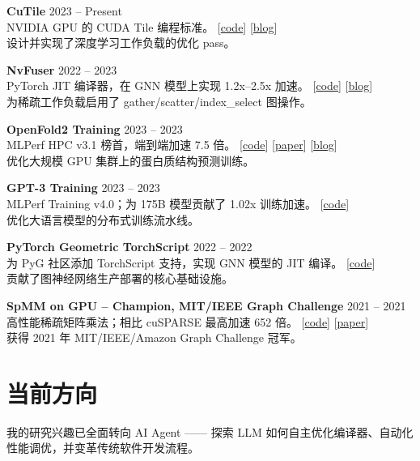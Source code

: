 \documentclass[11pt,a4paper]{article}
\newcommand{\projectentry}[5]{%
    \noindent\textbf{#1} \hfill #2 \\[2pt]
    #4 \hfill {\small #3} \\[1pt]
    #5\par\vspace{8pt}%
}
\begin{document}
\projectentry{CuTile}{2023 -- Present}{[\href{https://github.com/NVIDIA/cutile-python}{code}] [\href{https://developer.nvidia.com/blog/tag/cutile/}{blog}]}
{NVIDIA GPU 的 CUDA Tile 编程标准。}
{设计并实现了深度学习工作负载的优化 pass。}

\projectentry{NvFuser}{2022 -- 2023}{[\href{https://github.com/csarofeen/pytorch/commits/devel/?author=ftxj}{code}] [\href{https://pytorch.org/blog/introducing-nvfuser-a-deep-learning-compiler-for-pytorch/}{blog}]}
{PyTorch JIT 编译器，在 GNN 模型上实现 1.2x--2.5x 加速。}
{为稀疏工作负载启用了 gather/scatter/index\_select 图操作。}

\projectentry{OpenFold2 Training}{2023 -- 2023}{[\href{https://github.com/mlcommons/hpc_results_v3.0/tree/main/NVIDIA/benchmarks/openfold}{code}] [\href{https://arxiv.org/abs/2404.11068}{paper}] [\href{https://developer.nvidia.com/blog/optimizing-openfold-training-for-drug-discovery/}{blog}]}
{MLPerf HPC v3.1 榜首，端到端加速 7.5 倍。}
{优化大规模 GPU 集群上的蛋白质结构预测训练。}

\projectentry{GPT-3 Training}{2023 -- 2023}{[\href{https://github.com/NVIDIA/Megatron-LM}{code}]}
{MLPerf Training v4.0；为 175B 模型贡献了 1.02x 训练加速。}
{优化大语言模型的分布式训练流水线。}

\projectentry{PyTorch Geometric TorchScript}{2022 -- 2022}{[\href{https://github.com/pyg-team/pytorch_geometric/commits/master/?author=ftxj}{code}]}
{为 PyG 社区添加 TorchScript 支持，实现 GNN 模型的 JIT 编译。}
{贡献了图神经网络生产部署的核心基础设施。}

\projectentry{SpMM on GPU -- Champion, MIT/IEEE Graph Challenge}{2021 -- 2021}{[\href{https://github.com/CGCL-codes/Graphchallenge21}{code}] [\href{https://ieeexplore.ieee.org/document/9622791}{paper}]}
{高性能稀疏矩阵乘法；相比 cuSPARSE 最高加速 652 倍。}
{获得 2021 年 MIT/IEEE/Amazon Graph Challenge 冠军。}

\vspace{4pt}

\section{当前方向}

\noindent 我的研究兴趣已全面转向 AI Agent —— 探索 LLM 如何自主优化编译器、自动化性能调优，并变革传统软件开发流程。
\end{document}
